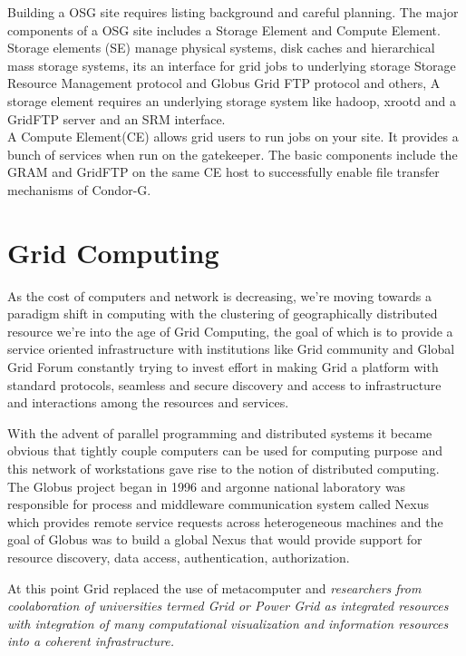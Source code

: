 \documentclass[ms,electronic,double]{nuthesis}
\begin{document}
Building a OSG site requires listing background and careful planning. The major 
components of a OSG site includes a Storage Element and Compute Element. \\

Storage elements (SE) manage physical systems, disk caches and hierarchical mass storage 
systems, its an interface for grid jobs to underlying storage Storage Resource Management protocol and Globus 
Grid FTP protocol and others, A storage element requires an underlying storage system like hadoop, xrootd
and a GridFTP server and an SRM interface.\\

A Compute Element(CE) allows grid users to run jobs on your site. It provides a 
bunch of services when run on the gatekeeper. The basic components include 
the GRAM and GridFTP on the same CE host to successfully enable file transfer 
mechanisms of Condor-G.\\

\section{Grid Computing}

As the cost of computers and network is decreasing, we're moving towards a 
paradigm shift in computing with the clustering of geographically distributed 
resource we're into the age of Grid Computing, the goal of which is to provide a 
service oriented infrastructure  with institutions like Grid community and Global Grid Forum 
constantly trying to invest effort in making Grid a platform with standard 
protocols, seamless and secure discovery and access to infrastructure and interactions among
 the resources and services.
 
 With the advent of parallel programming and distributed systems it became 
 obvious that tightly couple computers can be used for computing purpose and this 
 network of workstations  gave rise to the notion of distributed computing. 
 The Globus project began in 1996 and argonne national laboratory was responsible for process 
 and middleware communication system called Nexus which provides remote service 
 requests across heterogeneous machines and the goal of Globus was to build a 
 global Nexus that would provide support for resource discovery, data access, 
 authentication, authorization.

At this point Grid replaced the use of metacomputer and \emph{ researchers from 
coolaboration of universities termed Grid or Power Grid as integrated resources 
with integration of many computational visualization and information resources 
into a coherent infrastructure.}
\end{document}
